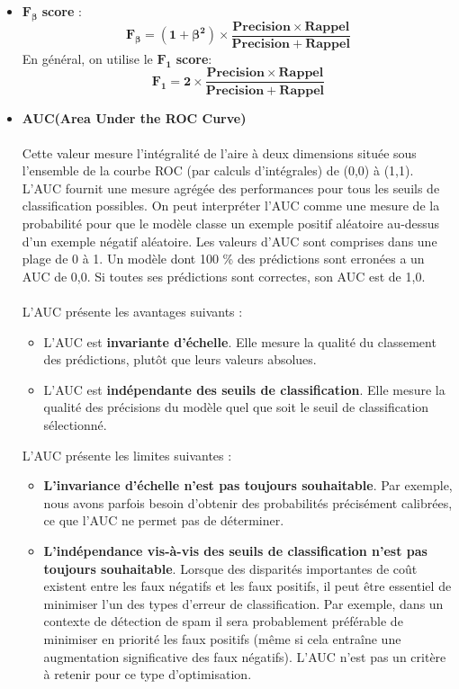 \documentclass[french]{article}
\begin{document}
	\begin{itemize}[label=\textbullet, font=\LARGE \color{red}]
		\item $\bm{F_{\beta}}$ \textbf{score} :
			$$\bm{F_{\beta}=(1+\beta^{2})\times \frac{Precision\times Rappel}{Precision+Rappel}}$$
			En général, on utilise le $\bm{F_{1}}$ \textbf{score}:
			$$\bm{F_{1}=2\times\frac{Precision\times Rappel}{Precision + Rappel}}$$
		\item \textbf{AUC(Area Under the ROC Curve)}\\\\ Cette valeur mesure l'intégralité de l'aire à deux dimensions située sous l'ensemble de la courbe ROC (par calculs d'intégrales) de (0,0) à (1,1).\\L'AUC fournit une mesure agrégée des performances pour tous les seuils de classification possibles. On peut interpréter l'AUC comme une mesure de la probabilité pour que le modèle classe un exemple positif aléatoire au-dessus d'un exemple négatif aléatoire. Les valeurs d'AUC sont comprises dans une plage de 0 à 1. Un modèle dont 100 \% des prédictions sont erronées a un AUC de 0,0. Si toutes ses prédictions sont correctes, son AUC est de 1,0.\\\\
		L'AUC présente les avantages suivants :
		\begin{itemize}[label=\textbullet]
			\item L'AUC est \textbf{invariante d'échelle}. Elle mesure la qualité du classement des prédictions, plutôt que leurs valeurs absolues.
			\item L'AUC est \textbf{indépendante des seuils de classification}. Elle mesure la qualité des précisions du modèle quel que soit le seuil de classification sélectionné.\\
		\end{itemize}
		L'AUC présente les limites suivantes :
		\begin{itemize}[label=\textbullet]
			\item \textbf{L'invariance d'échelle n'est pas toujours souhaitable}. Par exemple, nous avons parfois besoin d'obtenir des probabilités précisément calibrées, ce que l'AUC ne permet pas de déterminer.
			\item \textbf{L'indépendance vis-à-vis des seuils de classification n'est pas toujours souhaitable}. Lorsque des disparités importantes de coût existent entre les faux négatifs et les faux positifs, il peut être essentiel de minimiser l'un des types d'erreur de classification. Par exemple, dans un contexte de détection de spam il sera probablement préférable de minimiser en priorité les faux positifs (même si cela entraîne une augmentation significative des faux négatifs). L'AUC n'est pas un critère à retenir pour ce type d'optimisation.
		\end{itemize}
	\end{itemize}
	
\end{document}
